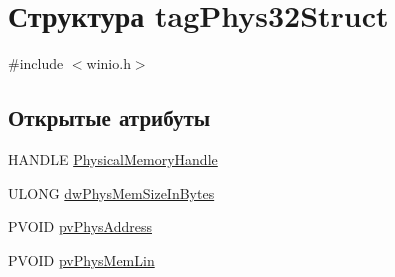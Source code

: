 \hypertarget{structtag_phys32_struct}{\section{Структура tag\-Phys32\-Struct}
\label{structtag_phys32_struct}
}


{\ttfamily \#include $<$winio.\-h$>$}

\subsection*{Открытые атрибуты}
\begin{DoxyCompactItemize}
\item 
H\-A\-N\-D\-L\-E \hyperlink{structtag_phys32_struct_a62728941351cae475f59a61518eed9d5}{Physical\-Memory\-Handle}
\item 
U\-L\-O\-N\-G \hyperlink{structtag_phys32_struct_adcb5fe8ed2f92bd1ee900a28a8926478}{dw\-Phys\-Mem\-Size\-In\-Bytes}
\item 
P\-V\-O\-I\-D \hyperlink{structtag_phys32_struct_aa7eb113c10d6a15445809774a7138452}{pv\-Phys\-Address}
\item 
P\-V\-O\-I\-D \hyperlink{structtag_phys32_struct_a6bdc8d696ccee449b9ba07ce0955e49b}{pv\-Phys\-Mem\-Lin}
\end{DoxyCompactItemize}


